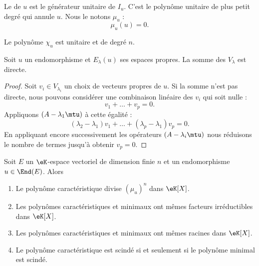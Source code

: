 \begin{definition}
    Le  de \( u\) est le générateur unitaire de \( I_u\). C'est le polynôme unitaire de plus petit degré qui annule \( u\). Nous le notons \( \mu_u\) :
\begin{equation}
    \mu_u(u)=0.
\end{equation}
\end{definition}

\begin{lemma}
    Le polynôme \( \chi_u\) est unitaire et de degré \( n\).
\end{lemma}

\begin{lemma}       \label{LemjcztYH}
    Soit \( u\) un endomorphisme et \( E_{\lambda}(u)\) ses espaces propres. La somme des \( V_{\lambda}\) est directe.
\end{lemma}

\begin{proof}
    Soit \( v_i\in V_{\lambda_i}\) un choix de vecteurs propres de \( u\). Si la somme n'est pas directe, nous pouvons considérer une combinaison linéaire des \( v_i\) qui soit nulle :
    \begin{equation}
        v_1+\ldots+v_p=0.
    \end{equation}
    Appliquons \( (A-\lambda_1\mtu)\) à cette égalité :
    \begin{equation}
        (\lambda_2-\lambda_1)v_1+\ldots+(\lambda_p-\lambda_1)v_p=0.
    \end{equation}
    En appliquant encore successivement les opérateurs \( (A-\lambda_i\mtu)\) nous réduisons le nombre de termes jusqu'à obtenir \( v_p=0\).
\end{proof}

\begin{theorem}     \label{ThoNhbrUL}
    Soit \( E\) un \(\eK\)-espace vectoriel de dimension finie \( n\) et un endomorphisme \( u\in\End(E)\). Alors
    \begin{enumerate}
        \item
            Le polynôme caractéristique divise \( (\mu_u)^n\) dans \(\eK[X]\).
        \item
            Les polynômes caractéristiques et minimaux ont mêmes facteurs irréductibles dans \(\eK[X]\).
        \item
            Les polynômes caractéristiques et minimaux ont mêmes racines dans \(\eK[X]\).
        \item
            Le polynôme caractéristique est scindé si et seulement si le polynôme minimal est scindé.
    \end{enumerate}
\end{theorem}


